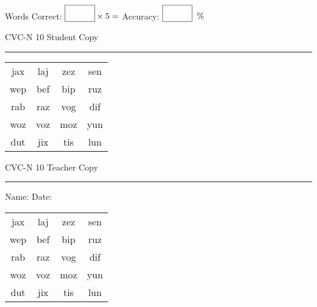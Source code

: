 \documentclass{memoir}
\begin{document}
\small

Words Correct: $\fbox{\phantom{\huge 100}} \times 5 = $ Accuracy: $\fbox{\phantom{\huge 100}}\;\; \%$ 

\vfill

\newpage


\footnotesize \noindent
CVC-N 10 \hfill Student Copy
\smallskip
\hrule

\Large

\setlength{\tabcolsep}{14pt}
\def\arraystretch{2}

{\selectfont


\begin{vplace}[0.5]
\begin{center}
\begin{tabular}{cccc}
jax & laj & zez & sen \\
wep & bef & bip & ruz \\
rab & raz & vog & dif \\
woz & voz & moz & yun \\
dut & jix & tis & lun \\
\end{tabular}
\end{center}
\end{vplace}

}

\newpage

\footnotesize \noindent
CVC-N 10 \hfill Teacher Copy
\smallskip
\hrule

\small

\vfill

\noindent
Name: \underline{\hspace{1.75in}} \hfill Date: \underline{\hspace{1in}}

\Large

{\selectfont


\begin{vplace}[0.5]
\begin{center}
\begin{tabular}{cccc}
jax & laj & zez & sen \\
wep & bef & bip & ruz \\
rab & raz & vog & dif \\
woz & voz & moz & yun \\
dut & jix & tis & lun \\
\end{tabular}
\end{center}
\end{vplace}



}
\end{document}
